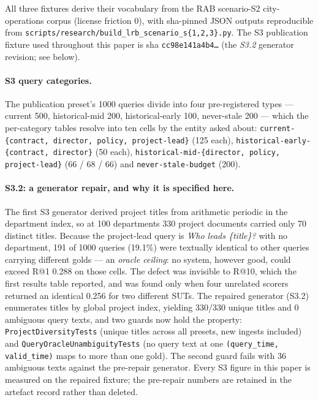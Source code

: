 \documentclass[11pt,a4paper]{article}
\begin{document}
All three fixtures derive their vocabulary from the RAB scenario-S2 city-operations corpus (license friction 0), with sha-pinned JSON outputs reproducible from \texttt{scripts/research/build\_lrb\_scenario\_s\{1,2,3\}.py}. The S3 publication fixture used throughout this paper is sha \texttt{cc98e141a4b4\ldots} (the \emph{S3.2} generator revision; see below).

\paragraph{S3 query categories.} The publication preset's 1000 queries divide into four pre-registered types --- current 500, historical-mid 200, historical-early 100, never-stale 200 --- which the per-category tables resolve into ten cells by the entity asked about: \texttt{current-\{contract, director, policy, project-lead\}} (125 each), \texttt{historical-early-\{contract, director\}} (50 each), \texttt{historical-mid-\{director, policy, project-lead\}} (66 / 68 / 66) and \texttt{never-stale-budget} (200).

\paragraph{S3.2: a generator repair, and why it is specified here.} The first S3 generator derived project titles from arithmetic periodic in the department index, so at 100 departments 330 project documents carried only 70 distinct titles. Because the project-lead query is \emph{Who leads \{title\}?} with no department, 191 of 1000 queries (19.1\%) were textually identical to other queries carrying different golds --- an \emph{oracle ceiling}: no system, however good, could exceed R@1 0.288 on those cells. The defect was invisible to R@10, which the first results table reported, and was found only when four unrelated scorers returned an identical 0.256 for two different SUTs. The repaired generator (S3.2) enumerates titles by global project index, yielding 330/330 unique titles and 0 ambiguous query texts, and two guards now hold the property: \texttt{ProjectDiversityTests} (unique titles across all presets, new ingests included) and \texttt{QueryOracleUnambiguityTests} (no query text at one \texttt{(query\_time, valid\_time)} maps to more than one gold). The second guard fails with 36 ambiguous texts against the pre-repair generator. Every S3 figure in this paper is measured on the repaired fixture; the pre-repair numbers are retained in the artefact record rather than deleted.
\end{document}
